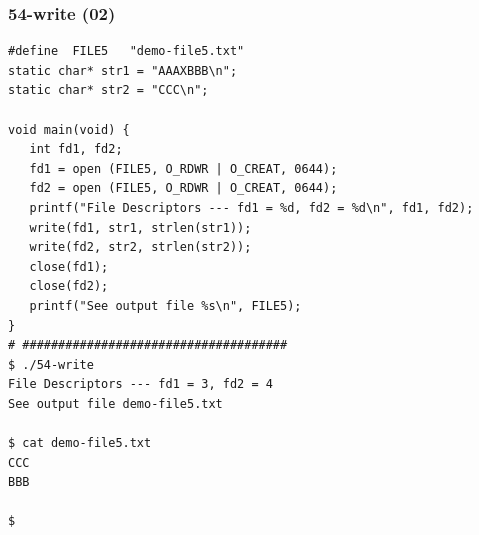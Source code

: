 \documentclass[aspectratio=169, xcolor=table, notheorems, hyperref={pdfpagelabels=false}]{beamer}
\begin{document}
\begin{frame}[fragile]
\frametitle{54-write (02)}
\begin{lstlisting}[basicstyle=\ttfamily\tiny]
#define  FILE5   "demo-file5.txt"
static char* str1 = "AAAXBBB\n";
static char* str2 = "CCC\n";

void main(void) {
   int fd1, fd2;
   fd1 = open (FILE5, O_RDWR | O_CREAT, 0644);
   fd2 = open (FILE5, O_RDWR | O_CREAT, 0644);
   printf("File Descriptors --- fd1 = %d, fd2 = %d\n", fd1, fd2);
   write(fd1, str1, strlen(str1));
   write(fd2, str2, strlen(str2));
   close(fd1);
   close(fd2);
   printf("See output file %s\n", FILE5);
}
# #####################################
$ ./54-write 
File Descriptors --- fd1 = 3, fd2 = 4
See output file demo-file5.txt

$ cat demo-file5.txt 
CCC
BBB

$ 

\end{lstlisting}
\end{frame}

\end{document}
